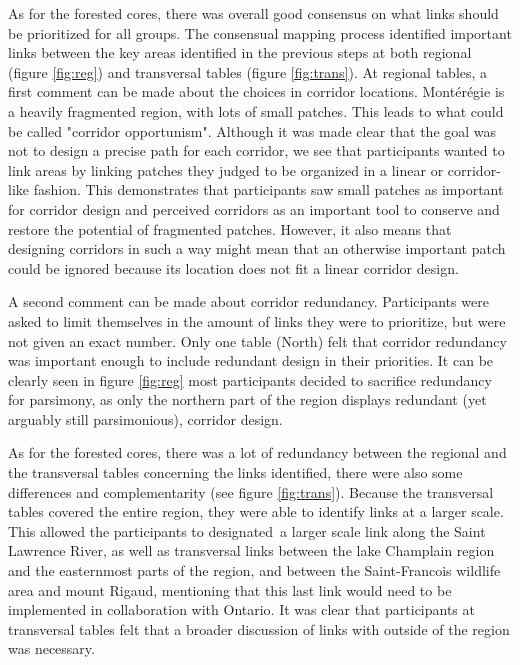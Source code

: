 As for the forested cores, there was overall good consensus on what links should be prioritized for all groups. The consensual mapping process identified important links between the key areas identified in the previous steps at both regional (figure \ref{fig:reg}) and transversal tables (figure \ref{fig:trans}). At regional tables, a first comment can be made about the choices in corridor locations. Montérégie is a heavily fragmented region, with lots of small patches. This leads to what could be called "corridor opportunism". Although it was made clear that the goal was not to design a precise path for each corridor, we see that participants wanted to link areas by linking patches they judged to be organized in a linear or corridor-like fashion. This demonstrates that participants saw small patches as important for corridor design and perceived corridors as an important tool to conserve and restore the potential of fragmented patches. However, it also means that designing corridors in such a way  might mean that an otherwise important patch could be ignored because its location does not fit a linear corridor design.

A second comment can be made about corridor redundancy. Participants were asked to limit themselves in the amount of links they were to prioritize, but were not given an exact number. Only one table (North) felt that corridor redundancy was important enough to include redundant design in their priorities. It can be clearly seen in figure \ref{fig:reg} most participants decided to sacrifice redundancy for parsimony, as only the northern part of the region displays redundant (yet arguably still parsimonious), corridor design.

As for the forested cores, there was a lot of redundancy between the regional and the transversal tables concerning the links identified, there were also some differences and complementarity (see figure \ref{fig:trans}). Because the transversal tables covered the entire region, they were able to identify links at a larger scale. This allowed the participants to designated\ a larger scale link along the Saint Lawrence River, as well as transversal links between the lake Champlain region and the easternmost parts of the region, and between the Saint-Francois wildlife area and mount Rigaud, mentioning that this last link would need to be implemented in collaboration with Ontario. It was clear that participants at transversal tables felt that a broader discussion of links with outside of the region was necessary. \\

